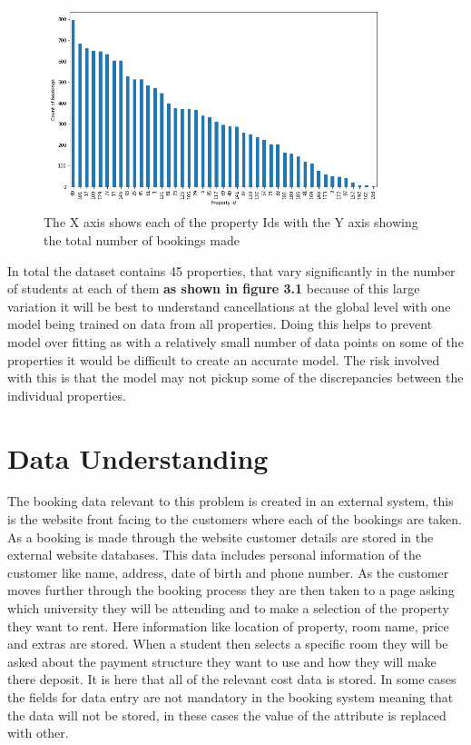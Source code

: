 \begin{figure}[hbt!]
 \includegraphics[width=10cm]{figures/bookings_by_property.png}
 \caption{The X axis shows each of the property Ids with the Y axis showing the total number of bookings made}
\end{figure}



In total the dataset contains 45 properties, that vary significantly in the number of students at each of them \textbf{as shown in figure 3.1} because of this large variation it will be best to understand cancellations at the global level with one model being trained on data from all properties. Doing this helps to prevent model over fitting as with a relatively small number of data points on some of the properties it would be difficult to create an accurate model. The risk involved with this is that the model may not pickup some of the discrepancies between the individual properties.


\section{Data Understanding}

The booking data relevant to this problem is created in an external system, this is the website front facing to the customers where each of the bookings are taken. As a booking is made through the website customer details are stored in the external website databases. This data includes personal information of the customer like name, address, date of birth and phone number. As the customer moves further through the booking process they are then taken to a page asking which university they will be attending and to make a selection of the property they want to rent. Here information like location of property, room name, price and extras are stored. When a student then selects a specific room they will be asked about the payment structure they want to use and how they will make there deposit. It is here that all of the relevant cost data is stored. In some cases the fields for data entry are not mandatory in the booking system meaning that the data will not be stored, in these cases the value of the attribute is replaced with other.

